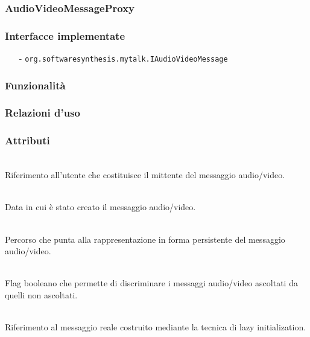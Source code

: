 \subsubsection{AudioVideoMessageProxy}\label{sec:audiovideomessageproxy}

\subsubsection*{Interfacce implementate}
\begin{itemize}[noitemsep,nolistsep]
  \item[-]\texttt{org.softwaresynthesis.mytalk.IAudioVideoMessage}
\end{itemize}

\subsubsection*{Funzionalità}

\subsubsection*{Relazioni d'uso}

\subsubsection*{Attributi}
\begin{description}
  \item{}\\
Riferimento all'utente che costituisce il mittente del messaggio audio/video.
  \item{}\\
Data in cui è stato creato il messaggio audio/video.
  \item{}\\
Percorso che punta alla rappresentazione in forma persistente del messaggio audio/video.
  \item{}\\
Flag booleano che permette di discriminare i messaggi audio/video ascoltati da quelli non ascoltati.
  \item{}\\
Riferimento al messaggio reale costruito mediante la tecnica di lazy initialization.
\end{description}

